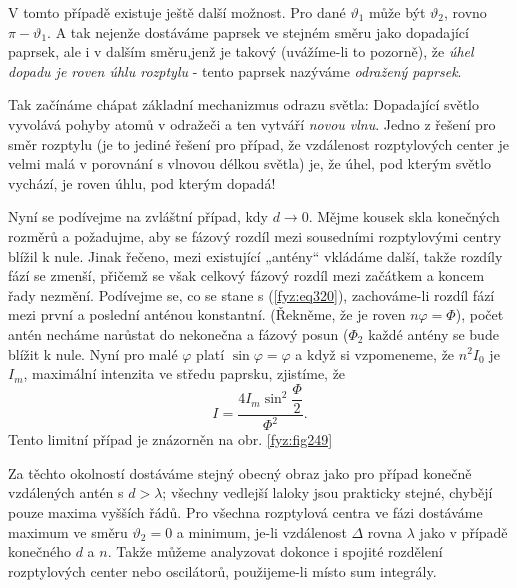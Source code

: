     V tomto případě existuje ještě další možnost. Pro dané \(\vartheta_1\) může být 
    \(\vartheta_2\), rovno \(\pi-\vartheta_1\). A tak nejenže dostáváme paprsek ve stejném směru 
    jako dopadající paprsek, ale i v dalším směru,jenž je takový (uvážíme-li to pozorně), že 
    \emph{úhel dopadu je roven úhlu rozptylu} - tento paprsek nazýváme \emph{odražený paprsek}.
    
    Tak začínáme chápat základní mechanizmus odrazu světla: Dopadající světlo vyvolává pohyby atomů 
    v odražeči a ten vytváří \emph{novou vlnu}. Jedno z řešení pro směr rozptylu (je to jediné 
    řešení pro případ, že vzdálenost rozptylových center je velmi malá v porovnání s vlnovou délkou 
    světla) je, že úhel, pod kterým světlo vychází, je roven úhlu, pod kterým dopadá!
    
    Nyní se podívejme na zvláštní případ, kdy \(d\rightarrow 0\). Mějme kousek skla konečných 
    rozměrů a požadujme, aby se fázový rozdíl mezi sousedními rozptylovými centry blížil k nule. 
    Jinak řečeno, mezi existující „antény“ vkládáme další, takže rozdíly fází se zmenší, přičemž se 
    však celkový fázový rozdíl mezi začátkem a koncem řady nezmění. Podívejme se, co se stane s 
    (\ref{fyz:eq320}), zachováme-li rozdíl fází mezi první a poslední anténou konstantní. (Řekněme, 
    že je roven \(n\varphi = \Phi\)), počet antén necháme narůstat do nekonečna a fázový posun 
    (\(\Phi_2\) každé antény se bude blížit k nule. Nyní pro malé \(\varphi\) platí 
    \(\sin\varphi=\varphi\) a když si vzpomeneme, že \(n^2I_0\) je \(I_m\), maximální intenzita ve 
    středu paprsku, zjistíme, že
    \begin{equation}\label{fyz:eq325}
      I = \frac{4I_m\sin^2\dfrac{\Phi}{2}}{\Phi^2}.
    \end{equation}
    Tento limitní případ je znázorněn na obr. \ref{fyz:fig249}
    
    Za těchto okolností dostáváme stejný obecný obraz jako pro případ konečně vzdálených antén s 
    \(d > \lambda\); všechny vedlejší laloky jsou prakticky stejné, chybějí pouze maxima vyšších 
    řádů. Pro všechna rozptylová centra ve fázi dostáváme maximum ve směru \(\vartheta_2 = 0\) a 
    minimum, je-li vzdálenost \(\Delta\) rovna \(\lambda\) jako v případě konečného \(d\) a \(n\). 
    Takže můžeme analyzovat dokonce i spojité rozdělení rozptylových center nebo oscilátorů, 
    použijeme-li místo sum integrály.
    
